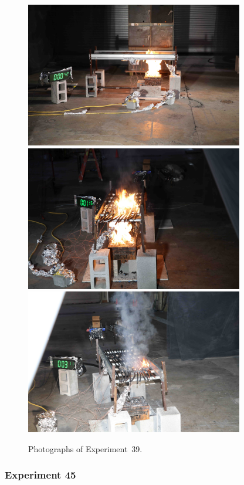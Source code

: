 \begin{figure}[p]
\centering
\includegraphics[height=2.50in]{../FIGURES/Test_39_side} \\
\includegraphics[height=2.50in]{../FIGURES/Test_39_1_min_36_s} \\
\includegraphics[height=2.50in]{../FIGURES/Test_39_3_min_11_s}
\caption[Photographs of Experiment~39]{Photographs of Experiment~39.}
\label{fig:Test_39_photos}
\end{figure}


\clearpage

\subsubsection{Experiment 45}

